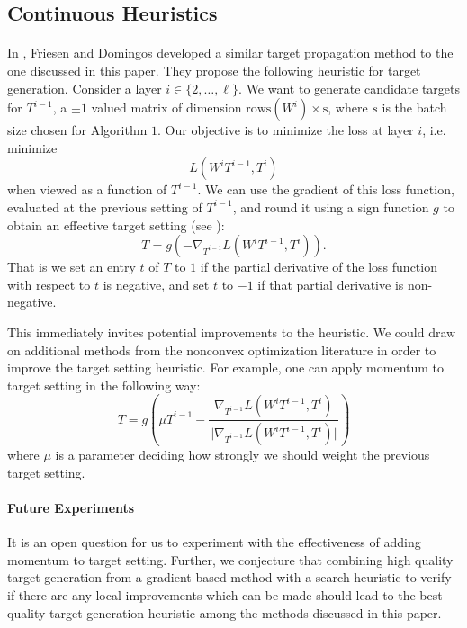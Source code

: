 \subsection{Continuous Heuristics}
\paragraph{}
In \cite{friesen2017deep}, Friesen and Domingos developed a similar target propagation method to the one discussed in this paper. They propose the following heuristic for target generation. Consider a layer $i\in \{2,\dots, \ell\}$. We want to generate candidate targets for $T^{i-1}$, a $\pm 1$ valued matrix of dimension $\text{rows}(W^i)\times \text{s}$, where $s$ is the batch size chosen for Algorithm $1$. Our objective is to minimize the loss at layer $i$, i.e. minimize
$$L(W^iT^{i-1}, T^i)$$
when viewed as a function of $T^{i-1}$. We can use the gradient of this loss function, evaluated at the previous setting of $T^{i-1}$, and round it using a sign function $g$ to obtain an effective target setting (see \cite{friesen2017deep}):
$$T = g(-\nabla_{T^{i-1}}L(W^iT^{i-1}, T^i)).$$
That is we set an entry $t$ of $T$ to $1$ if the partial derivative of the loss function with respect to $t$ is negative, and set $t$ to $-1$ if that partial derivative is non-negative.

This immediately invites potential improvements to the heuristic. We could draw on additional methods from the nonconvex optimization literature in order to improve the target setting heuristic. For example, one can apply momentum to target setting in the following way:
$$T = g\left(\mu T^{i-1} - \frac{\nabla_{T^{i-1}}L(W^iT^{i-1}, T^i)}{ \Vert \nabla_{T^{i-1}}L(W^iT^{i-1}, T^i) \Vert}\right)$$
where $\mu$ is a parameter deciding how strongly we should weight the previous target setting.
\paragraph{Future Experiments}
It is an open question for us to experiment with the effectiveness of adding momentum to target setting. Further, we conjecture that combining high quality target generation from a gradient based method with a search heuristic to verify if there are any local improvements which can be made should lead to the best quality target generation heuristic among the methods discussed in this paper.